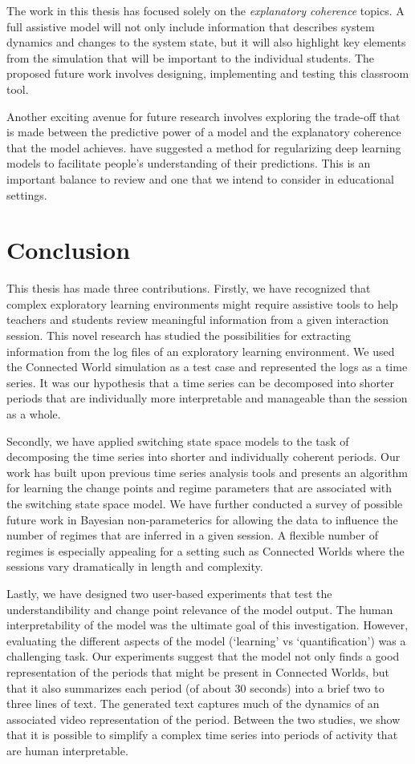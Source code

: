 The work in this thesis has focused solely on the \textit{explanatory coherence} topics. A full assistive model will not only include information that describes system dynamics and changes to the system state, but it will also highlight key elements from the simulation that will be important to the individual students. The proposed future work involves designing, implementing and testing this classroom tool.

Another exciting avenue for future research involves exploring the trade-off that is made between the predictive power of a model and the explanatory coherence that the model achieves. \cite{wu2017beyond} have suggested a method for regularizing deep learning models to facilitate people's understanding of their predictions. This is an important balance to review and one that we intend to consider in educational settings.

\section{Conclusion}

This thesis has made three contributions. Firstly, we have recognized that complex exploratory learning environments might require assistive tools to help teachers and students review meaningful information from a given interaction session. This novel research has studied the possibilities for extracting information from the log files of an exploratory learning environment. We used the Connected World simulation as a test case and represented the logs as a time series. It was our hypothesis that a time series can be decomposed into shorter periods that are individually more interpretable and manageable than the session as a whole.

Secondly, we have applied switching state space models to the task of decomposing the time series into shorter and individually coherent periods. Our work has built upon previous time series analysis tools and presents an algorithm for learning the change points and regime parameters that are associated with the switching state space model. We have further conducted a survey of possible future work in Bayesian non-parameterics for allowing the data to influence the number of regimes that are inferred in a given session. A flexible number of regimes is especially appealing for a setting such as Connected Worlds where the sessions vary dramatically in length and complexity.

Lastly, we have designed two user-based experiments that test the understandibility and change point relevance of the model output. The human interpretability of the model was the ultimate goal of this investigation. However, evaluating the different aspects of the model (`learning' vs `quantification') was a challenging task. Our experiments suggest that the model not only finds a good representation of the periods that might be present in Connected Worlds, but that it also summarizes each period (of about 30 seconds) into a brief two to three lines of text. The generated text captures much of the dynamics of an associated video representation of the period. Between the two studies, we show that it is possible to simplify a complex time series into periods of activity that are human interpretable.

